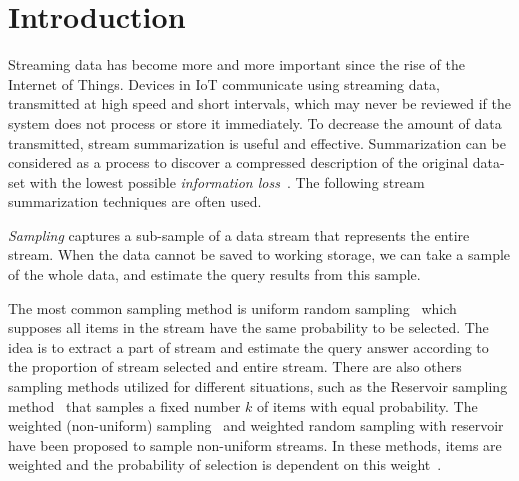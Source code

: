 \section{Introduction}

Streaming data has become more and more important since the rise of the Internet
of Things. Devices in IoT communicate using streaming data, transmitted
at high speed and short intervals, which may never be reviewed if the system
does not process or store it immediately. To decrease the amount of data
transmitted, stream summarization is useful and effective. Summarization can
be considered as a process to discover a compressed description of the original data-set with the lowest possible \emph{information
loss}~\cite{chandola2007summarization}.
The following stream summarization techniques are often used.

\emph{Sampling} captures a sub-sample of a data stream that represents the
entire stream. When the data cannot be saved to working storage,
we can take a sample of the whole data, and estimate the query results from this sample.

The most common sampling method is uniform random
sampling~\cite{vitter1984faster, Ahrens1985SequentialRS} which supposes all
items in the stream have the same probability to be selected. The idea is to
extract a part of stream and estimate the query answer according to the
proportion of stream selected and entire stream. There are also others sampling
methods utilized for different situations, such as the Reservoir sampling
method~\cite{vitter1985random, vitter1985random, Aggarwal2007DataS} that samples
a fixed number $k$  of items with equal probability. The weighted (non-uniform)
sampling~\cite{chaudhuri1999random} and weighted random sampling with
reservoir~\cite{efraimidis2006weighted} have been proposed to sample non-uniform
streams. In these methods, items are weighted and the probability of selection
is dependent on this weight~\cite{chaudhuri1999random}.

